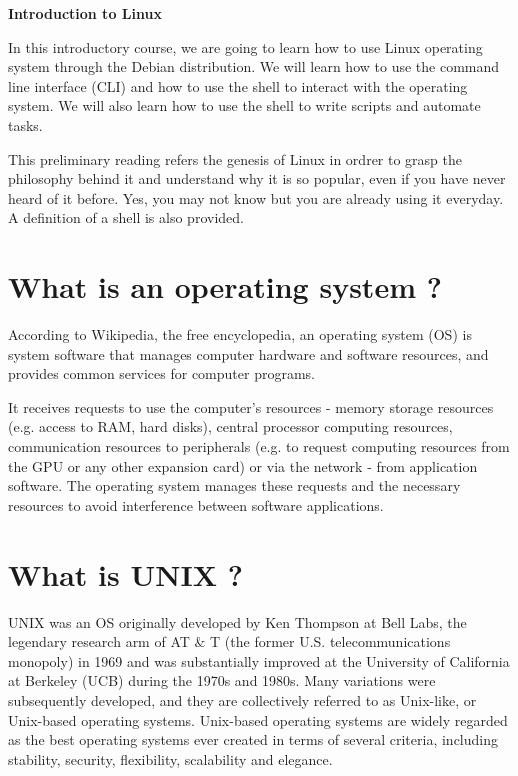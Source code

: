 \documentclass[11pt]{article}
\begin{document}
\begin{center}
{\vspace{2cm}
    \Large \bf Introduction to Linux\\}
    \vspace{1em}
\end{center}

In this introductory course, we are going to learn how to use Linux operating system through the Debian distribution. We will learn how to use the command line interface (CLI) and how to use the shell to interact with the operating system. We will also learn how to use the shell to write scripts and automate tasks.

This preliminary reading refers the genesis of Linux in ordrer to grasp the philosophy behind it and understand why it is so popular, even if you have never heard of it before. Yes, you may not know but you are already using it everyday. A definition of a shell is also provided.

\section{What is an operating system ?}
According to Wikipedia, the free encyclopedia, an operating system (OS) is system software that manages computer hardware and software resources, and provides common services for computer programs. 

It receives requests to use the computer's resources - memory storage resources (e.g. access to RAM, hard disks), central processor computing resources, communication resources to peripherals (e.g. to request computing resources from the GPU or any other expansion card) or via the network - from application software. The operating system manages these requests and the necessary resources to avoid interference between software applications.

\section{What is UNIX ?}
UNIX was an OS originally developed by Ken Thompson at Bell Labs, the legendary research arm of AT $\&$ T (the former U.S. telecommunications monopoly) in 1969 and was substantially improved at the University of California at Berkeley (UCB) during the 1970s and 1980s. Many variations were subsequently developed, and they are collectively referred to as Unix-like, or Unix-based operating systems. Unix-based operating systems are widely regarded as the best operating systems ever created in terms of several criteria, including stability, security, flexibility, scalability and elegance.
\end{document}
